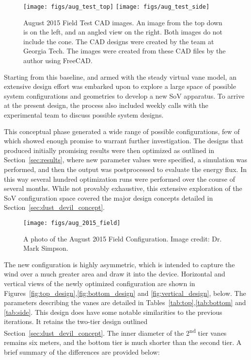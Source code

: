   \begin{figure}[!htb]
   \centering
   \texttt{[image: figs/aug\_test\_top]}
   \hfill
   \texttt{[image: figs/aug\_test\_side]}
   \caption{August 2015 Field Test CAD images. An image from the top
   down is on the left, and an angled view on the right. Both images do
   not include the cone. The CAD designs were created by the team at
   Georgia Tech. The images were created from these CAD files by the
   author using FreeCAD\cite{Falck}.}  
   \label{fig:cad_aug_2015}
  \end{figure}

Starting from this baseline, and armed with the steady virtual vane
model, an extensive design effort was embarked upon to explore a large space
of possible system configurations and geometries to develop a new 
SoV apparatus. To arrive at the present design, the
process also included weekly calls with the experimental team to discuss
possible system designs.  

This conceptual phase generated a wide range of possible
configurations, few of which showed enough promise to warrant further
investigation. The designs that produced initially promising results were
then optimized as outlined in 
Section~\ref{sec:results}, where new parameter values were specified, a
simulation was performed, and then the output was postprocessed to evaluate the
energy flux. In this way several
hundred optimization runs were performed over the course of several
months. While not provably exhaustive, this extensive exploration of the 
SoV configuration space covered the major design concepts detailed
in Section~\ref{sec:dust_devil_concept}. 

  \begin{figure}[!htb]
   \centering
   \texttt{[image: figs/aug\_2015\_field]}
   \caption{A photo of the August 2015 Field Configuration. Image
   credit: Dr. Mark Simpson.}  
   \label{fig:aug_2015_field}
  \end{figure}

The new configuration is highly asymmetric, which is intended to capture
the wind over 
a much greater area and draw it into the
device. Horizontal and vertical views of the newly optimized configuration
are shown in Figures~\ref{fig:top_design},\ref{fig:bottom_design} and
\ref{fig:vertical_design}, below. The parameters describing the
vanes are detailed in Tables~\ref{tab:top},\ref{tab:bottom} and
\ref{tab:side}. This design does have some notable 
similarities to the previous iterations. It retains the two-tier
design outlined Section~\ref{sec:dust_devil_concept}. The inner diameter 
of the 2\textsuperscript{nd} tier vanes remains six meters, and the
bottom tier is much shorter than the second tier. A brief summary of the
differences are provided below:      

